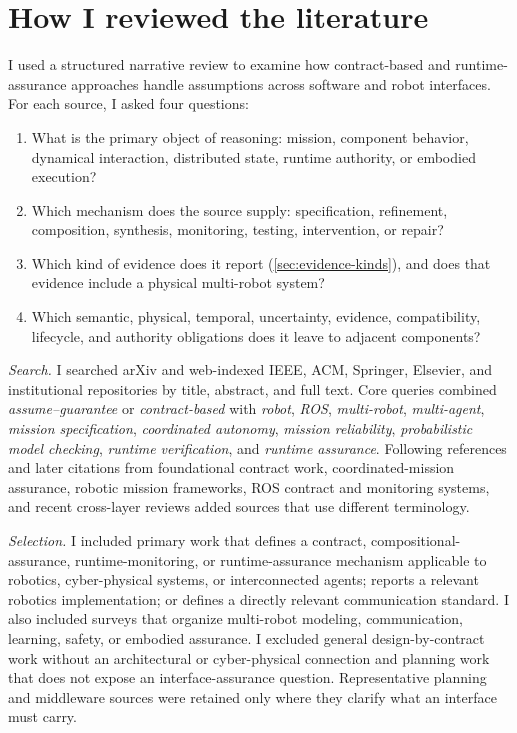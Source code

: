 \section{How I reviewed the literature}
\label{sec:method}

I used a structured narrative review to examine how contract-based and
runtime-assurance approaches handle assumptions across software and robot
interfaces.  For each source, I asked four questions:
\begin{enumerate}
  \item What is the primary object of reasoning: mission, component behavior,
    dynamical interaction, distributed state, runtime authority, or embodied
    execution?
  \item Which mechanism does the source supply: specification, refinement,
    composition, synthesis, monitoring, testing, intervention, or repair?
  \item Which kind of evidence does it report (\cref{sec:evidence-kinds}), and
    does that evidence include a physical multi-robot system?
  \item Which semantic, physical, temporal, uncertainty, evidence,
    compatibility, lifecycle, and authority obligations does it leave to
    adjacent components?
\end{enumerate}

\emph{Search.}  I searched arXiv and web-indexed IEEE, ACM, Springer, Elsevier,
and institutional repositories by title, abstract, and full text.  Core queries
combined \emph{assume--guarantee} or \emph{contract-based} with \emph{robot},
\emph{ROS}, \emph{multi-robot}, \emph{multi-agent}, \emph{mission
specification}, \emph{coordinated autonomy}, \emph{mission reliability},
\emph{probabilistic model checking}, \emph{runtime verification}, and
\emph{runtime assurance}.  Following references and later citations from foundational
contract work, coordinated-mission assurance, robotic mission frameworks, ROS
contract and monitoring systems, and recent cross-layer reviews added sources
that use different terminology.

\emph{Selection.}  I included primary work that defines a contract,
compositional-assurance, runtime-monitoring, or runtime-assurance mechanism
applicable to robotics, cyber-physical systems, or interconnected agents;
reports a relevant robotics implementation; or defines a directly relevant
communication standard.  I also included surveys that organize multi-robot
modeling, communication, learning, safety, or embodied assurance.  I excluded
general design-by-contract work without an architectural or cyber-physical
connection and planning work that does not expose an interface-assurance
question.  Representative planning and middleware sources were retained only
where they clarify what an interface must carry.

